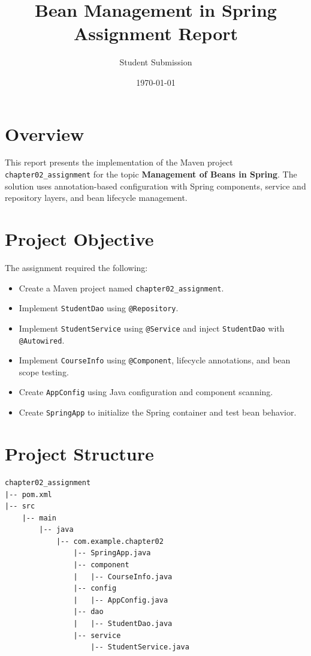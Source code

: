 \documentclass[12pt,a4paper]{article}
\title{\textbf{Bean Management in Spring}\\[4pt]\large Assignment Report}
\author{Student Submission}
\date{\today}
\begin{document}
\maketitle

\section{Overview}
This report presents the implementation of the Maven project \texttt{chapter02\_assignment} for the topic \textbf{Management of Beans in Spring}. The solution uses annotation-based configuration with Spring components, service and repository layers, and bean lifecycle management.

\section{Project Objective}
The assignment required the following:
\begin{itemize}
    \item Create a Maven project named \texttt{chapter02\_assignment}.
    \item Implement \texttt{StudentDao} using \texttt{@Repository}.
    \item Implement \texttt{StudentService} using \texttt{@Service} and inject \texttt{StudentDao} with \texttt{@Autowired}.
    \item Implement \texttt{CourseInfo} using \texttt{@Component}, lifecycle annotations, and bean scope testing.
    \item Create \texttt{AppConfig} using Java configuration and component scanning.
    \item Create \texttt{SpringApp} to initialize the Spring container and test bean behavior.
\end{itemize}

\section{Project Structure}
\begin{lstlisting}
chapter02_assignment
|-- pom.xml
|-- src
    |-- main
        |-- java
            |-- com.example.chapter02
                |-- SpringApp.java
                |-- component
                |   |-- CourseInfo.java
                |-- config
                |   |-- AppConfig.java
                |-- dao
                |   |-- StudentDao.java
                |-- service
                    |-- StudentService.java
\end{lstlisting}
\end{document}

